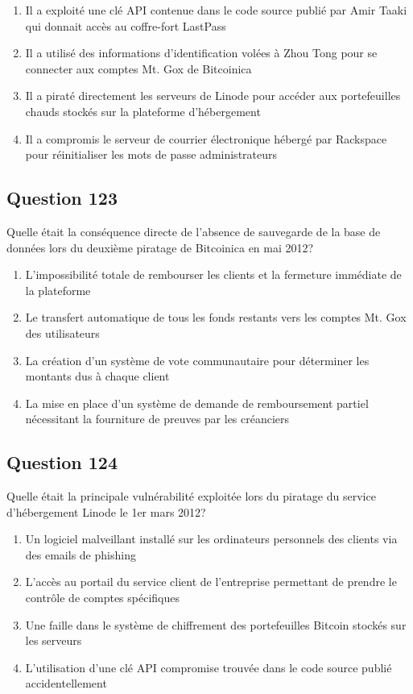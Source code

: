 \documentclass[12pt,a4paper]{article}
\begin{document}
\begin{enumerate}[label=\Alph*., leftmargin=*]
\item Il a exploité une clé API contenue dans le code source publié par Amir Taaki qui donnait accès au coffre-fort LastPass
\item Il a utilisé des informations d'identification volées à Zhou Tong pour se connecter aux comptes Mt. Gox de Bitcoinica
\item Il a piraté directement les serveurs de Linode pour accéder aux portefeuilles chauds stockés sur la plateforme d'hébergement
\item Il a compromis le serveur de courrier électronique hébergé par Rackspace pour réinitialiser les mots de passe administrateurs
\end{enumerate}

\bigskip


\subsection*{Question 123}
Quelle était la conséquence directe de l'absence de sauvegarde de la base de données lors du deuxième piratage de Bitcoinica en mai 2012?

\begin{enumerate}[label=\Alph*., leftmargin=*]
\item L'impossibilité totale de rembourser les clients et la fermeture immédiate de la plateforme
\item Le transfert automatique de tous les fonds restants vers les comptes Mt. Gox des utilisateurs
\item La création d'un système de vote communautaire pour déterminer les montants dus à chaque client
\item La mise en place d'un système de demande de remboursement partiel nécessitant la fourniture de preuves par les créanciers
\end{enumerate}

\bigskip


\subsection*{Question 124}
Quelle était la principale vulnérabilité exploitée lors du piratage du service d'hébergement Linode le 1er mars 2012?

\begin{enumerate}[label=\Alph*., leftmargin=*]
\item Un logiciel malveillant installé sur les ordinateurs personnels des clients via des emails de phishing
\item L'accès au portail du service client de l'entreprise permettant de prendre le contrôle de comptes spécifiques
\item Une faille dans le système de chiffrement des portefeuilles Bitcoin stockés sur les serveurs
\item L'utilisation d'une clé API compromise trouvée dans le code source publié accidentellement
\end{enumerate}
\end{document}
